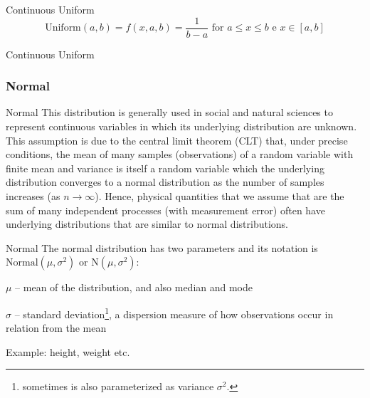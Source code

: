 \begin{frame}{Continuous Uniform}
	$$\text{Uniform}(a,b) = f(x, a, b) = \frac{1}{b-a} \text{ for $a \leq x \leq b$ e $x \in [a, b]$}$$
\end{frame}

\begin{frame}{Continuous Uniform}
	\centering
\end{frame}

\subsubsection{Normal}
\begin{frame}{Normal}
	This distribution is generally used in social and natural sciences to
	represent continuous variables in which its underlying distribution are unknown.
	This assumption is due to the central limit theorem (CLT) that,
	under precise conditions, the mean of many samples (observations) of a
	random variable with finite mean and variance is itself a random variable
	which the underlying distribution converges to a normal distribution
	as the number of samples increases (as $n \to \infty$).
	\vfill
	Hence, physical quantities that we assume that are the sum of many
	independent processes (with measurement error) often have underlying
	distributions that are similar to normal distributions.
\end{frame}

\begin{frame}{Normal}
	The normal distribution has two parameters and its notation is
	$\text{Normal}(\mu, \sigma^2)$ or $\text{N}(\mu, \sigma^2)$:
	\begin{vfilleditems}
		\item $\mu$ -- mean of the distribution, and also median and mode
		\item $\sigma$ -- standard deviation\footnote{sometimes is also parameterized as variance $\sigma^2$.},
		a dispersion measure of how observations occur in relation from the mean
	\end{vfilleditems}
	\vfill
	Example: height, weight etc.
\end{frame}

